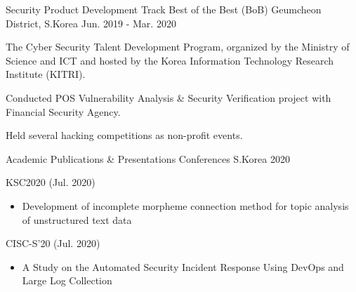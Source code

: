
\begin{cventries}

\cventry
  {Security Product Development Track} %
  {Best of the Best (BoB)} %
  {Geumcheon District, S.Korea} %
  {Jun. 2019 - Mar. 2020} %
  {
    \begin{cvitems}
      \item {The Cyber Security Talent Development Program, organized by the Ministry of Science and ICT and hosted by the Korea Information Technology Research Institute (KITRI).}
      \item {Conducted POS Vulnerability Analysis \& Security Verification project with Financial Security Agency.}
      \item {Held several hacking competitions as non-profit events.}
    \end{cvitems}
  }

\cventry
  {Academic Publications \& Presentations} %
  {Conferences} %
  {S.Korea} %
  {2020} %
  {
    \begin{cvitems}
      \item {KSC2020 (Jul. 2020)}
      \begin{itemize}
        \item {Development of incomplete morpheme connection method for topic analysis of unstructured text data}
      \end{itemize}
      \item {CISC-S'20 (Jul. 2020)}
      \begin{itemize}
        \item {A Study on the Automated Security Incident Response Using DevOps and Large Log Collection}
      \end{itemize}
    \end{cvitems}
  }


\end{cventries}
